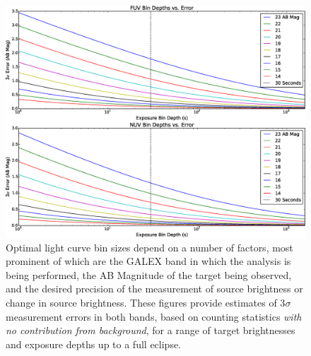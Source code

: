 \documentclass[preprint]{aastex}
\begin{document}
\begin{figure}
\includegraphics[scale=0.49]{Fig13.eps}
\caption{Optimal light curve bin sizes depend on a number of factors, most prominent of which are the GALEX band in which the analysis is being performed, the AB Magnitude of the target being observed, and the desired precision of the measurement of source brightness or change in source brightness. These figures provide estimates of 3$\sigma$ measurement errors in both bands, based on counting statistics \emph{with no contribution from background}, for a range of target brightnesses and exposure depths up to a full eclipse.
\label{sigmadetlim}}
\end{figure}


\clearpage
\end{document}

